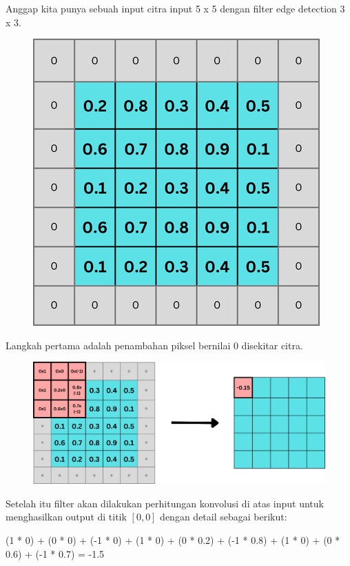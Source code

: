 \noindent Anggap kita punya sebuah input citra input 5 x 5 dengan filter edge detection 3 x 3.

\begin{figure}[H]
	\centering
	\includegraphics[scale=.3]{gambar/lampiran/padding.png}
\end{figure}

\noindent Langkah pertama adalah penambahan piksel bernilai 0 disekitar citra.


\begin{figure}[H]
	\centering
	\includegraphics[scale=.3]{gambar/lampiran/posisi-awal.png}
\end{figure}
\noindent Setelah itu filter akan dilakukan perhitungan konvolusi di atas input untuk menghasilkan output di titik \([0,0]\) dengan detail sebagai berikut: 

(1 * 0) + (0 * 0) + (-1 * 0) + (1 * 0) + (0 * 0.2) + (-1 * 0.8) + (1 * 0) + (0 * 0.6) + (-1 * 0.7) = -1.5


